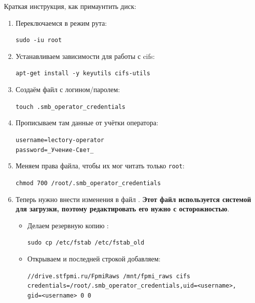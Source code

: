 Краткая инструкция, как примаунтить диск:
\begin{enumerate}
  \item Переключаемся в режим рута:
        \begin{tcolorbox}
          \texttt{sudo -iu root}
        \end{tcolorbox}

  \item Устанавливаем зависимости для работы с cifs:
        \begin{tcolorbox}
          \texttt{apt-get install -y keyutils cifs-utils}
        \end{tcolorbox}

  \item Создаём файл с логином/паролем:
        \begin{tcolorbox}
          \texttt{touch .smb\_operator\_credentials}
        \end{tcolorbox}

  \item Прописываем там данные от учётки оператора:
        \begin{tcolorbox}
          \texttt{username=lectory-operator} \\
          \texttt{password=\_Учение-Свет\_}
        \end{tcolorbox}

  \item Меняем права файла, чтобы их мог читать только \texttt{root}:
        \begin{tcolorbox}
          \texttt{chmod 700 /root/.smb\_operator\_credentials}
        \end{tcolorbox}

  \item Теперь нужно внести изменения в файл . \textbf{Этот файл используется системой для загрузки, поэтому редактировать его нужно с осторожностью}.
        \begin{itemize}
          \item Делаем резервную копию :
                \begin{tcolorbox}
                  \texttt{sudo cp /etc/fstab /etc/fstab\_old}
                \end{tcolorbox}

          \item Открываем  и последней строкой добавляем:
                \begin{tcolorbox}
                  {
                    \small\texttt{//drive.stfpmi.ru/FpmiRaws \qquad /mnt/fpmi\_raws \qquad cifs \qquad credentials=/root/.smb\_operator\_credentials,uid=<username>,
                      gid=<username> 0 0}
                  }
                \end{tcolorbox}


\end{itemize}
\end{enumerate}
